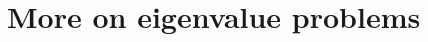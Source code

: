 \chapter{More on eigenvalue problems} \label{SL:chapter}
\renewcommand{\thesection}{\thechapter.\the\value{section}}






\sectionnewpage





\sectionnewpage

